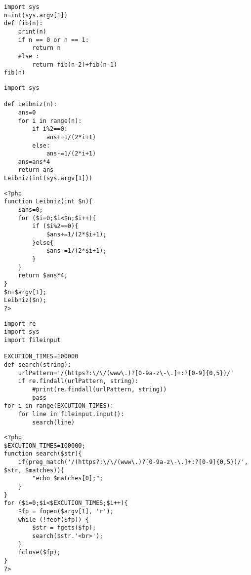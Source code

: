 \begin{lstlisting}[label={fig:f-py}, caption={Python3 フィボナッチ数列}, basicstyle=\ttfamily\footnotesize, frame=single]
import sys
n=int(sys.argv[1])
def fib(n):
	print(n)
	if n == 0 or n == 1:
		return n
	else :
		return fib(n-2)+fib(n-1)
fib(n)
\end{lstlisting}

\clearpage

\begin{lstlisting}[label={fig:p-py}, caption={Python3 円周率の算出}, basicstyle=\ttfamily\footnotesize, frame=single]
import sys

def Leibniz(n):
    ans=0
    for i in range(n):
        if i%2==0:
            ans+=1/(2*i+1)
        else:
            ans-=1/(2*i+1)
    ans=ans*4
    return ans
Leibniz(int(sys.argv[1]))
\end{lstlisting}

\begin{lstlisting}[label={fig:p-php}, caption={PHP 円周率の算出}, basicstyle=\ttfamily\footnotesize, frame=single]
<?php
function Leibniz(int $n){
    $ans=0;
    for ($i=0;$i<$n;$i++){
        if ($i%2==0){
            $ans+=1/(2*$i+1);
        }else{
            $ans-=1/(2*$i+1);
        }
    }
    return $ans*4;
}
$n=$argv[1];
Leibniz($n);
?>
\end{lstlisting}

\clearpage

\begin{lstlisting}[label={fig:s-py}, caption={Python3 正規表現}, basicstyle=\ttfamily\footnotesize, frame=single]
import re
import sys
import fileinput

EXCUTION_TIMES=100000
def search(string):
    urlPattern='/(https?:\/\/(www\.)?[0-9a-z\-\.]+:?[0-9]{0,5})/'
    if re.findall(urlPattern, string):
        #print(re.findall(urlPattern, string))
        pass
for i in range(EXCUTION_TIMES):
    for line in fileinput.input():
        search(line)
\end{lstlisting}

\begin{lstlisting}[label={fig:s-php}, caption={PHP 正規表現}, basicstyle=\ttfamily\footnotesize, frame=single]
<?php
$EXCUTION_TIMES=100000;
function search($str){
    if(preg_match('/(https?:\/\/(www\.)?[0-9a-z\-\.]+:?[0-9]{0,5})/', $str, $matches)){
        "echo $matches[0];";
    }
}
for ($i=0;$i<$EXCUTION_TIMES;$i++){
    $fp = fopen($argv[1], 'r');
    while (!feof($fp)) {
        $str = fgets($fp);
        search($str.'<br>');
    }
    fclose($fp);
}
?>
\end{lstlisting}